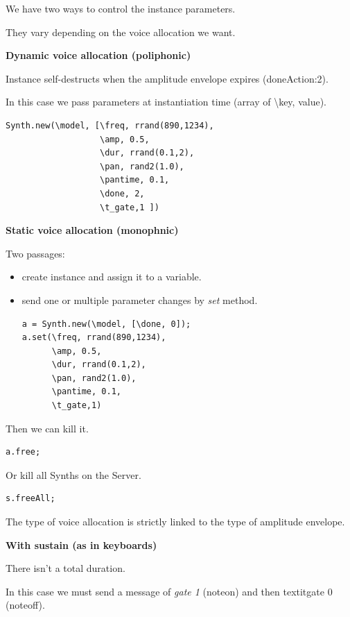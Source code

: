 We have two ways to control the instance parameters.

They vary depending on the voice allocation we want.

\textbf{Dynamic voice allocation (poliphonic)} 

Instance self-destructs when the amplitude envelope expires (doneAction:2).

In this case we pass parameters at instantiation time (array of \textbackslash key, value).

\begin{lstlisting}[frame=single,caption=Dynamic voice allocation] 
Synth.new(\model, [\freq, rrand(890,1234), 
                   \amp, 0.5, 
                   \dur, rrand(0.1,2), 
                   \pan, rand2(1.0), 
                   \pantime, 0.1, 
                   \done, 2, 
                   \t_gate,1 ])
\end{lstlisting}

\textbf{Static voice allocation (monophnic)}

Two passages: 

\begin{itemize}
\tightlist
\item create instance and assign it to a variable.
\item send one or multiple parameter changes by \textit{set} method.

\begin{lstlisting}[frame=single, caption=Static voice allocation] 
a = Synth.new(\model, [\done, 0]);
a.set(\freq, rrand(890,1234), 
      \amp, 0.5, 
      \dur, rrand(0.1,2), 
      \pan, rand2(1.0), 
      \pantime, 0.1, 
      \t_gate,1)
\end{lstlisting}
\end{itemize}

Then we can kill it.

\begin{lstlisting}[frame=single] 
a.free;
\end{lstlisting}
Or kill all Synths on the Server.

\begin{lstlisting}[frame=single] 
s.freeAll;
\end{lstlisting}
The type of voice allocation is strictly linked to the type of amplitude envelope.

\textbf{With sustain (as in keyboards)}

There isn't a total duration.

In this case we must send a message of \textit{gate 1} (noteon) and then textit{gate 0} (noteoff).


